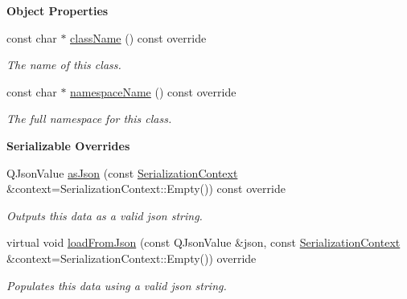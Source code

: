 \begin{Indent}\textbf{ Object Properties}\par
\begin{DoxyCompactItemize}
\item 
const char $\ast$ \mbox{\hyperlink{classrev_1_1_scene_object_a511357629f9d5957355f9a5cec239ec4}{class\+Name}} () const override
\begin{DoxyCompactList}\small\item\em The name of this class. \end{DoxyCompactList}\item 
const char $\ast$ \mbox{\hyperlink{classrev_1_1_scene_object_a63816cdf271b38d1e058c2c2847a0f1e}{namespace\+Name}} () const override
\begin{DoxyCompactList}\small\item\em The full namespace for this class. \end{DoxyCompactList}\end{DoxyCompactItemize}
\end{Indent}
\begin{Indent}\textbf{ Serializable Overrides}\par
\begin{DoxyCompactItemize}
\item 
\mbox{\label{classrev_1_1_scene_object_aea8cdb9da420d4ba2ed40c2d92eaedba}} 
Q\+Json\+Value \mbox{\hyperlink{classrev_1_1_scene_object_aea8cdb9da420d4ba2ed40c2d92eaedba}{as\+Json}} (const \mbox{\hyperlink{structrev_1_1_serialization_context}{Serialization\+Context}} \&context=Serialization\+Context\+::\+Empty()) const override
\begin{DoxyCompactList}\small\item\em Outputs this data as a valid json string. \end{DoxyCompactList}\item 
\mbox{\label{classrev_1_1_scene_object_a7c17602598aa392defe844aca240ea60}} 
virtual void \mbox{\hyperlink{classrev_1_1_scene_object_a7c17602598aa392defe844aca240ea60}{load\+From\+Json}} (const Q\+Json\+Value \&json, const \mbox{\hyperlink{structrev_1_1_serialization_context}{Serialization\+Context}} \&context=Serialization\+Context\+::\+Empty()) override
\begin{DoxyCompactList}\small\item\em Populates this data using a valid json string. \end{DoxyCompactList}\end{DoxyCompactItemize}
\end{Indent}
